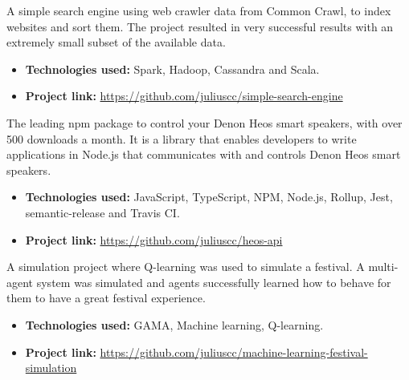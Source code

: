 

A simple search engine using web crawler data from Common Crawl, to index websites and sort them. The project resulted in very successful results with an extremely small subset of the available data.

\vspace{6pt}

\begin{itemize}
    \item \textbf{Technologies used:} Spark, Hadoop, Cassandra and Scala.
    \item \textbf{Project link:} \href{https://github.com/juliuscc/simple-search-engine}{https://github.com/juliuscc/simple-search-engine}
\end{itemize}

\divider

The leading npm package to control your Denon Heos smart speakers, with over 500 downloads a month. It is a library that enables developers to write applications in Node.js that communicates with and controls Denon Heos smart speakers.

\vspace{6pt}

\begin{itemize}
    \item \textbf{Technologies used:} JavaScript, TypeScript, NPM, Node.js, Rollup, Jest, semantic-release and Travis CI.
    \item \textbf{Project link:} \href{https://github.com/juliuscc/heos-api}{https://github.com/juliuscc/heos-api}
\end{itemize}

\divider

A simulation project where Q-learning was used to simulate a festival. A multi-agent system was simulated and agents successfully learned how to behave for them to have a great festival experience.

\vspace{6pt}

\begin{itemize}
    \item \textbf{Technologies used:} GAMA, Machine learning, Q-learning.
    \item \textbf{Project link:} \href{https://github.com/juliuscc/machine-learning-festival-simulation}{https://github.com/juliuscc/machine-learning-festival-simulation}
\end{itemize}



